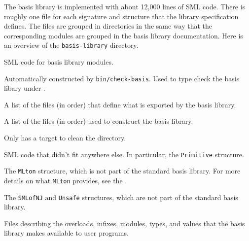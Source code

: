 
The basis library is implemented with about 12,000 lines of SML code.  There is
roughly one file for each signature and structure that the library specification
defines.  The files are grouped in directories in the same way that the
corresponding modules are grouped in the basis library documentation.  Here is
an overview of the {\tt basis-library} directory.

\begin{description}
SML code for basis library modules.

Automatically constructed by {\tt bin/check-basis}.  Used to type check the
basis libary under {\smlnj}.

A list of the files (in order) that define what is exported by the basis
library.

A list of the files (in order) used to construct the basis library.

Only has a target to clean the directory.

SML code that didn't fit anywhere else.  In particular, the {\tt Primitive}
structure.

The {\tt MLton} structure, which is not part of the standard basis library.
For more details on what {\tt MLton} provides, see the {\userguide}.

The {\tt SMLofNJ} and {\tt Unsafe} structures, which are not part of the
standard basis library.

Files describing the overloads, infixes, modules, types, and values that the
basis library makes available to user programs.
\end{description}

